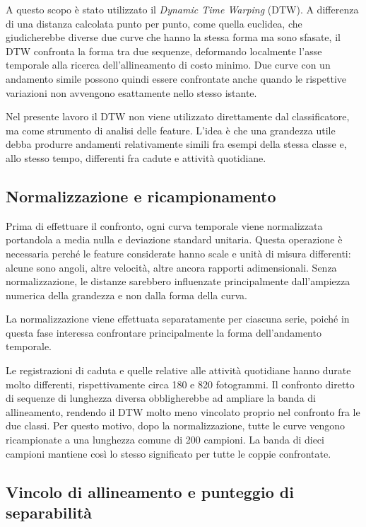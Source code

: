 A questo scopo è stato utilizzato il \emph{Dynamic Time Warping} (DTW). A differenza di una distanza calcolata punto per punto, come quella euclidea, che giudicherebbe diverse due curve che hanno la stessa forma ma sono sfasate, il DTW confronta la forma tra due sequenze, deformando localmente l'asse temporale alla ricerca dell'allineamento di costo minimo. Due curve con un andamento simile possono quindi essere confrontate anche quando le rispettive variazioni non avvengono esattamente nello stesso istante.

Nel presente lavoro il DTW non viene utilizzato direttamente dal classificatore, ma come strumento di analisi delle feature. L'idea è che una grandezza utile debba produrre andamenti relativamente simili fra esempi della stessa classe e, allo stesso tempo, differenti fra cadute e attività quotidiane.

\subsection{Normalizzazione e ricampionamento}

Prima di effettuare il confronto, ogni curva temporale viene normalizzata portandola a media nulla e deviazione standard unitaria. Questa operazione è necessaria perché le feature considerate hanno scale e unità di misura differenti: alcune sono angoli, altre velocità, altre ancora rapporti adimensionali. Senza normalizzazione, le distanze sarebbero influenzate principalmente dall'ampiezza numerica della grandezza e non dalla forma della curva.

La normalizzazione viene effettuata separatamente per ciascuna serie, poiché in questa fase interessa confrontare principalmente la forma dell'andamento temporale.

Le registrazioni di caduta e quelle relative alle attività quotidiane hanno durate molto differenti, rispettivamente circa 180 e 820 fotogrammi. Il confronto diretto di sequenze di lunghezza diversa obbligherebbe ad ampliare la banda di allineamento, rendendo il DTW molto meno vincolato proprio nel confronto fra le due classi. Per questo motivo, dopo la normalizzazione, tutte le curve vengono ricampionate a una lunghezza comune di 200 campioni. La banda di dieci campioni mantiene così lo stesso significato per tutte le coppie confrontate.

\subsection{Vincolo di allineamento e punteggio di separabilità}


